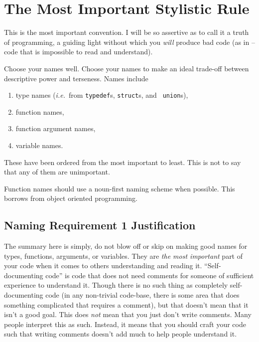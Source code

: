 \documentclass[11pt,onecolumn]{article}
\def\ie{\textit{i.e.}}
\newcommand{\head}[1]{\vspace{0.4em}\noindent{\bf #1}}
\begin{document}
\section{The Most Important Stylistic Rule}
\label{s:naming}

This is the most important convention.  I will be so assertive as to
call it a truth of programming, a guiding light without which you {\em
  will} produce bad code (as in -- code that is impossible to read and
understand).

\head{Requirement 1.} Choose your names well.  Choose your names to
make an ideal trade-off between descriptive power and terseness.
Names include
\begin{enumerate}[itemsep=0pt,topsep=1pt,parsep=1pt,leftmargin=2.5em]
\item type names (\ie\ from {\tt typedef}s, {\tt struct}s, and {\tt
  union}s),
\item function names,
\item function argument names,
\item variable names.
\end{enumerate}
These have been ordered from the most important to least.  This is not
to say that any of them are unimportant.

\head{Convention 1.} Function names should use a noun-first naming
scheme when possible.  This borrows from object oriented programming.

\subsection{Naming Requirement 1 Justification}
\label{ss:variables}

The summary here is simply, do not blow off or skip on making good
names for types, functions, arguments, or variables.  They are {\em
  the most important} part of your code when it comes to others
understanding and reading it.  ``Self-documenting code'' is code that
does not need comments for someone of sufficient experience to
understand it.  Though there is no such thing as completely
self-documenting code (in any non-trivial code-base, there is some
area that does something complicated that requires a comment), but
that doesn't mean that it isn't a good goal.  This does {\em not} mean
that you just don't write comments.  Many people interpret this as
such.  Instead, it means that you should craft your code such that
writing comments doesn't add much to help people understand it.
\end{document}
